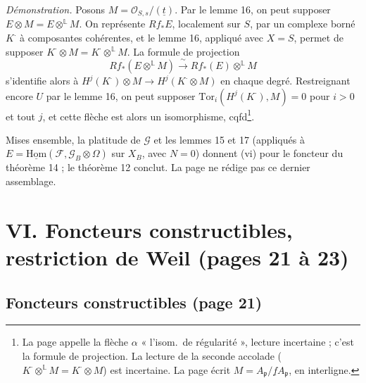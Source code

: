 \documentclass[11pt,a4paper]{article}
\begin{document}
\emph{Démonstration.} Posons $M = \mathcal{O}_{S,s}/(\underline{t})$. Par le
lemme 16, on peut supposer $E \otimes M = E \otimes^{\mathbb{L}} M$. On
représente $Rf_{*}E$, localement sur $S$, par un complexe borné $K^{\cdot}$ à
composantes cohérentes, et le lemme 16, appliqué avec $X = S$, permet de
supposer $K^{\cdot} \otimes M = K^{\cdot} \otimes^{\mathbb{L}} M$. La formule
de projection
\[
  Rf_{*}(E \otimes^{\mathbb{L}} M) \xrightarrow{\ \sim\ }
  Rf_{*}(E) \otimes^{\mathbb{L}} M
\]
s'identifie alors à $H^{j}(K^{\cdot}) \otimes M \to H^{j}(K^{\cdot} \otimes
M)$ en chaque degré. Restreignant encore $U$ par le lemme 16, on peut supposer
$\mathrm{Tor}_i(H^{j}(K^{\cdot}), M) = 0$ pour $i > 0$ et tout $j$, et cette
flèche est alors un isomorphisme, cqfd\footnote{La page appelle la flèche
$\alpha$ « l'isom.\ de régularité », lecture incertaine ; c'est la formule de
projection. La lecture de la seconde accolade
($K^{\cdot} \otimes^{\mathbb{L}} M = K^{\cdot} \otimes M$) est incertaine. La
page écrit $M = A_{\mathfrak{p}}/\underline{f}A_{\mathfrak{p}}$, en interligne.}.

Mises ensemble, la platitude de $\mathcal{G}$ et les lemmes 15 et 17
(appliqués à $E = \underline{\mathrm{Hom}}(\mathcal{F}, \mathcal{G}_B \otimes
\Omega)$ sur $X_B$, avec $N = 0$) donnent (vi) pour le foncteur du théorème
14 ; le théorème 12 conclut. La page ne rédige pas ce dernier assemblage.

\section*{VI. Foncteurs constructibles, restriction de Weil (pages 21 à 23)}

\subsection*{Foncteurs constructibles (page 21)}
\end{document}
